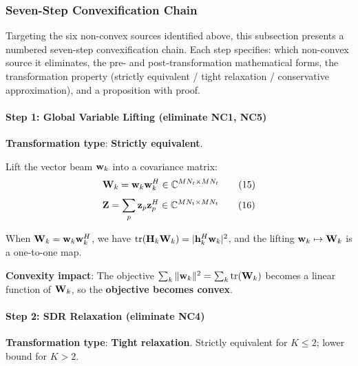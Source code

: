 \subsubsection{Seven-Step Convexification Chain}

Targeting the six non-convex sources identified above, this subsection presents a numbered seven-step convexification chain. Each step specifies: which non-convex source it eliminates, the pre- and post-transformation mathematical forms, the transformation property (strictly equivalent / tight relaxation / conservative approximation), and a proposition with proof.

\paragraph{Step 1: Global Variable Lifting (eliminate NC1, NC5)}
\textbf{Transformation type}: \textbf{Strictly equivalent}.

Lift the vector beam $\mathbf{w}_k$ into a covariance matrix:
\begin{equation}
\mathbf{W}_k = \mathbf{w}_k \mathbf{w}_k^H \in \mathbb{C}^{MN_t \times MN_t} \tag{15}
\end{equation}
\begin{equation}
\mathbf{Z} = \sum_p \mathbf{z}_p \mathbf{z}_p^H \in \mathbb{C}^{MN_t \times MN_t} \tag{16}
\end{equation}

\begin{proposition}\label{prop:lifting}
When $\mathbf{W}_k = \mathbf{w}_k \mathbf{w}_k^H$, we have $\text{tr}(\mathbf{H}_k \mathbf{W}_k) = |\mathbf{h}_k^H \mathbf{w}_k|^2$, and the lifting $\mathbf{w}_k \mapsto \mathbf{W}_k$ is a one-to-one map.
\end{proposition}

\textbf{Convexity impact}: The objective $\sum_k \|\mathbf{w}_k\|^2 = \sum_k \text{tr}(\mathbf{W}_k)$ becomes a linear function of $\mathbf{W}_k$, so the \textbf{objective becomes convex}.

\paragraph{Step 2: SDR Relaxation (eliminate NC4)}
\textbf{Transformation type}: \textbf{Tight relaxation}. Strictly equivalent for $K\leq 2$; lower bound for $K>2$.

